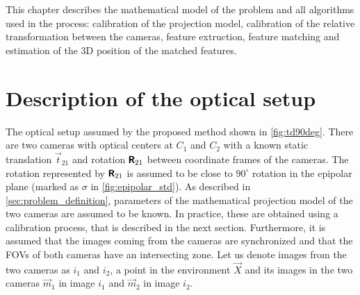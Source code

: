 This chapter describes the mathematical model of the problem and all algorithms used in the process: calibration of the projection model, calibration of the relative transformation between the cameras, feature extruction, feature matching and estimation of the 3D position of the matched features.

\section{Description of the optical setup}

The optical setup assumed by the proposed method shown in \autoref{fig:td90deg}.
There are two cameras with optical centers at $C_1$ and $C_2$ with a known static translation $\vec{t}_{21}$ and rotation $\pmb{\mathsf{R}}_{21}$ between coordinate frames of the cameras.
The rotation represented by $\pmb{\mathsf{R}}_{21}$ is assumed to be close to $90^\circ$ rotation in the epipolar plane (marked as $\sigma$ in \autoref{fig:epipolar_std}).
As described in \autoref{sec:problem_definition}, parameters of the mathematical projection model of the two cameras are assumed to be known. 
In practice, these are obtained using a calibration process, that is described in the next section.
Furthermore, it is assumed that the images coming from the cameras are synchronized and that the FOVs of both cameras have an intersecting zone.
Let us denote images from the two cameras as $i_1$ and $i_2$, a point in the environment $\vec{X}$ and its images in the two cameras $\vec{m}_1$ in image $i_1$ and $\vec{m}_2$ in image $i_2$.

